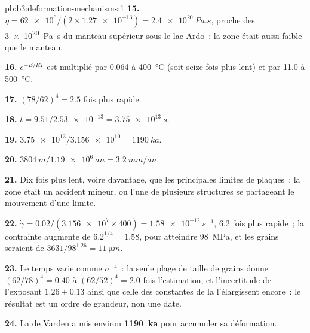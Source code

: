 \begin{solution}{pb:b3:deformation-mechanisms:1}
\textbf{15.} $\eta = \num{62e6}/(2\times\num{1.27e-13}) = \qty{2.4e20}{Pa.s}$,
proche des \qty{3e20}{Pa.s} du manteau supérieur sous le lac Ardo~: la zone
était aussi faible que le manteau.

\textbf{16.} $e^{-E/RT}$ est multiplié par 0.064 à \qty{400}{\celsius}
(soit seize fois plus lent) et par 11.0 à \qty{500}{\celsius}.

\textbf{17.} $(78/62)^4 = 2.5$ fois plus rapide.

\textbf{18.} $t = 9.51/\num{2.53e-13} = \qty{3.75e13}{s}$.

\textbf{19.} $\num{3.75e13}/\num{3.156e10} = \qty{1190}{ka}$.

\textbf{20.} $\qty{3804}{m}/\qty{1.19e6}{an} = \qty{3.2}{mm/an}$.

\textbf{21.} Dix fois plus lent, voire davantage, que les principales limites de plaques~: la zone
était un accident mineur, ou l'une de plusieurs structures se partageant le mouvement d'une limite.

\textbf{22.} $\dot\gamma = 0.02/(\num{3.156e7}\times400) = \qty{1.58e-12}{s^{-1}}$,
6.2 fois plus rapide~; la contrainte augmente de $6.2^{1/4} = 1.58$, pour atteindre \qty{98}{MPa}, et
les grains seraient de $3631/98^{1.26} = \qty{11}{\micro m}$.

\textbf{23.} Le temps varie comme $\sigma^{-4}$~: la seule plage de taille de grains donne
$(62/78)^4 = 0.40$ à $(62/52)^4 = 2.0$ fois l'estimation, et l'incertitude de
l'exposant $1.26 \pm 0.13$ ainsi que celle des constantes de la 
l'élargissent encore~: le résultat est un ordre de grandeur, non une date.

\textbf{24.} La  de Varden a mis environ
\textbf{\qty[text-series-to-math=true]{1190}{ka}} pour accumuler sa déformation.
\end{solution}
